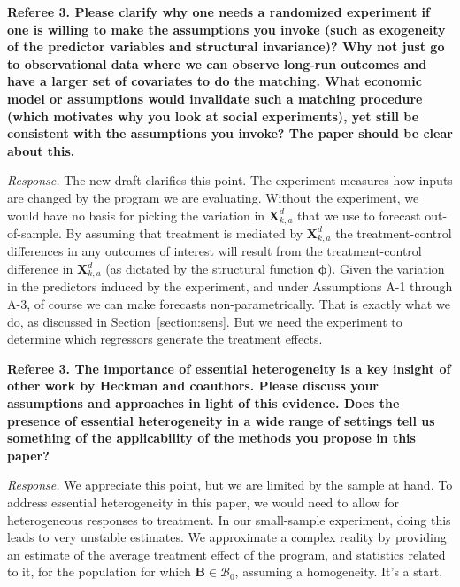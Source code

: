 \noindent \textbf{Referee 3. Please clarify why one needs a randomized experiment if one is willing to make the assumptions you invoke (such as exogeneity of the predictor variables and structural invariance)? Why not just go to observational data where we can observe long-run outcomes and have a larger set of covariates to do the matching. What economic model or assumptions would invalidate such a matching procedure (which motivates why you look at social experiments), yet still be consistent with the assumptions you invoke? The paper should be clear about this.}

\noindent \textit{Response.} The new draft clarifies this point. The experiment measures how inputs are changed by the program we are evaluating. Without the experiment, we would have no basis for picking the variation in $\bm{X}_{k,a}^d$ that we use to forecast out-of-sample. By assuming that treatment is mediated by $\bm{X}_{k,a}^d$ the treatment-control differences in any outcomes of interest will result from the treatment-control difference in $\bm{X}_{k,a}^d$ (as dictated by the structural function $\bm{\phi}$). Given the variation in the predictors induced by the experiment, and under Assumptions A-1 through A-3, of course we can make forecasts non-parametrically. That is exactly what we do, as discussed in Section~\ref{section:sens}. But we need the experiment to determine which regressors generate the treatment effects.

\noindent \textbf{Referee 3. The importance of essential heterogeneity is a key insight of other work by Heckman and coauthors. Please discuss your assumptions and approaches in light of this evidence. Does the presence of essential heterogeneity in a wide range of settings tell us something of the applicability of the methods you propose in this paper?}

\noindent \textit{Response.} We appreciate this point, but we are limited by the sample at hand. To address essential heterogeneity in this paper, we would need to allow for heterogeneous responses to treatment. In our small-sample experiment, doing this leads to very unstable estimates. We approximate a complex reality by providing an estimate of the average treatment effect of the program, and statistics related to it, for the population for which $\bm{B} \in \mathcal{B}_0$, assuming a homogeneity. It's a start.


\singlespace




